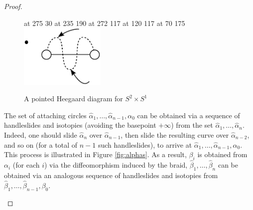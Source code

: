 \documentclass[11pt]{article}
\theoremstyle{plain} \newtheorem{thm}{Theorem}[subsection]
\theoremstyle{plain} \newtheorem{cor}[thm]{Corollary}
\theoremstyle{plain} \newtheorem{prop}[thm]{Proposition}
\theoremstyle{plain} \newtheorem{conj}[thm]{Conjecture}
\theoremstyle{plain} \newtheorem{lem}[thm]{Lemma}
\theoremstyle{definition} \newtheorem{df}[thm]{Definition}
\theoremstyle{remark} \newtheorem{rmk}[thm]{Remark}
\theoremstyle{remark} \newtheorem{obs}[thm]{Observation}
\newcommand{\ah}{\widehat{\alpha}}
\newcommand{\bh}{\widehat{\beta}}
\numberwithin{equation}{section}
\begin{document}
\begin{proof}
\begin{figure}[h!]
\centering
\begin{minipage}[c]{.35\linewidth}
\small
{} at 275 30
 at 235 190
 at 272 117
 at 120 117
\pinlabel* {$+\infty$} at 70 175
\endlabellist 
\includegraphics[height = 30mm]{S2S1HD}
\end{minipage}
\begin{minipage}[c]{.55\linewidth}
\caption{A pointed Heegaard diagram for $S^{2} \times S^{1}$ \label{fig:s2s1hd}}
\end{minipage}
\end{figure}

The set of attaching circles $\ah_{1}, \ldots, \ah_{n-1},\alpha_0$ can be obtained via a sequence of handleslides and isotopies (avoiding the basepoint $+\infty$) from the set $\ah_{1}, \ldots, \ah_{n}$.  Indeed, one should slide $\ah_{n}$ over $\ah_{n-1}$, then slide the resulting curve over $\ah_{n-2}$, and so on  (for a total of $n-1$ such handleslides), to arrive at $\ah_{1}, \ldots, \ah_{n-1},\alpha_0$.  This process is illustrated in Figure \ref{fig:alphas}.  As a result, $\beta_{i}$ is obtained from $\alpha_i$ (for each $i$) via the diffeomorphism induced by the braid, $\bh_{1}, \ldots, \bh_{n}$ can be obtained via an analogous sequence of handleslides and isotopies from $\bh_{1}, \ldots, \bh_{n-1}, \beta_{0}$.

\begin{figure}[h!]
\centering


\end{figure}
\end{proof}
\end{document}

